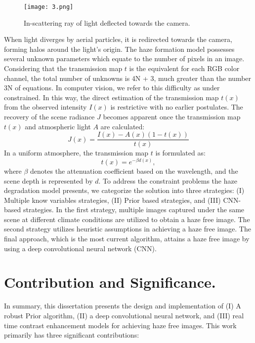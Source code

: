 \documentclass[doctor,english,listoffigures,listoftables]{thesis-uestc}
\begin{document}
\begin{figure}[H]
	\centering
	\texttt{[image: 3.png]}
	\caption{ In-scattering ray of light deflected towards the camera.}
	\label{fig3}
\end{figure}

When light diverges by aerial particles, it is redirected towards the camera, forming halos around the light's origin. The haze formation model possesses several unknown parameters which equate to the number of pixels in an image. Considering that the transmission map $t$ is the equivalent for each RGB color channel, the total number of unknowns is 4N + 3, much greater than the number 3N of equations. In computer vision, we refer to this difficulty as under constrained. In this way, the direct estimation of the transmission map $t{(x)}$ from the observed intensity $I{(x)}$ is restrictive with no earlier postulates. The recovery of the scene radiance $J$ becomes apparent once the transmission map $t{(x)}$ and atmospheric light $A$ are calculated:
\begin{equation}\label{scene}
	J(x)=\frac{I(x)-A(x)(1-t(x))}{t(x)}
\end{equation}
In a uniform atmosphere, the transmission map $t$ is formulated as:
\begin{equation}\label{scattering}
	t(x)=e^{-\beta d(x)},
\end{equation}
where $\beta$ denotes the attenuation coefficient based on the wavelength, and the scene depth is represented by $d$.
To address the constraint problems the haze degradation model presents, we categorize the solution into three strategies: (I) Multiple know variables strategies, (II) Prior based strategies, and (III) CNN-based strategies. In the first strategy, multiple images captured under the same scene at different climate conditions are utilized to obtain a haze free image. The second strategy utilizes heuristic assumptions in achieving a haze free image. The final approach, which is the most current algorithm, attains a haze free image by using a deep convolutional neural network (CNN).

\section{Contribution and Significance. }
In summary, this dissertation presents the design and implementation of (I) A robust Prior algorithm, (II) a deep convolutional neural network, and (III) real time contrast enhancement models for achieving haze free images. This work primarily has three significant contributions:
\end{document}
